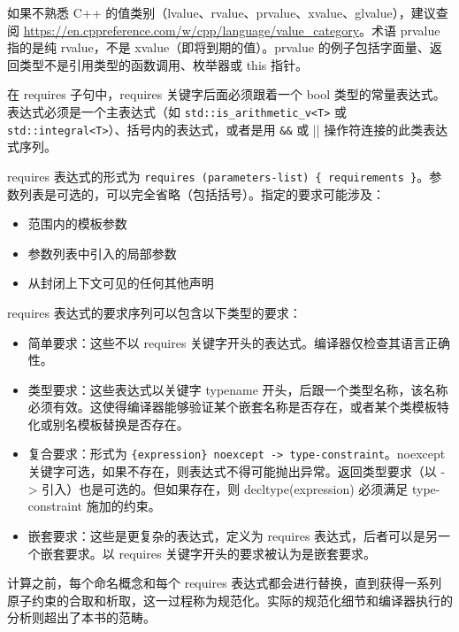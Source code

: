 \begin{myNotic}
如果不熟悉 C++ 的值类别（lvalue、rvalue、prvalue、xvalue、glvalue），建议查阅 \url{https://en.cppreference.com/w/cpp/language/value_category}。术语 prvalue 指的是纯 rvalue，不是 xvalue（即将到期的值）。prvalue 的例子包括字面量、返回类型不是引用类型的函数调用、枚举器或 this 指针。
\end{myNotic}

在 requires 子句中，requires 关键字后面必须跟着一个 bool 类型的常量表达式。表达式必须是一个主表达式（如 \verb|std::is_arithmetic_v<T>| 或 \verb|std::integral<T>|）、括号内的表达式，或者是用 \verb|&&| 或 || 操作符连接的此类表达式序列。

requires 表达式的形式为 \verb|requires (parameters-list) { requirements }|。参数列表是可选的，可以完全省略（包括括号）。指定的要求可能涉及：

\begin{itemize}
\item
范围内的模板参数

\item
参数列表中引入的局部参数

\item
从封闭上下文可见的任何其他声明
\end{itemize}

requires 表达式的要求序列可以包含以下类型的要求：

\begin{itemize}
\item
简单要求：这些不以 requires 关键字开头的表达式。编译器仅检查其语言正确性。

\item
类型要求：这些表达式以关键字 typename 开头，后跟一个类型名称，该名称必须有效。这使得编译器能够验证某个嵌套名称是否存在，或者某个类模板特化或别名模板替换是否存在。

\item
复合要求：形式为 \verb|{expression} noexcept -> type-constraint|。noexcept 关键字可选，如果不存在，则表达式不得可能抛出异常。返回类型要求（以 -> 引入）也是可选的。但如果存在，则 decltype(expression) 必须满足 type-constraint 施加的约束。

\item
嵌套要求：这些是更复杂的表达式，定义为 requires 表达式，后者可以是另一个嵌套要求。以 requires 关键字开头的要求被认为是嵌套要求。
\end{itemize}

计算之前，每个命名概念和每个 requires 表达式都会进行替换，直到获得一系列原子约束的合取和析取，这一过程称为规范化。实际的规范化细节和编译器执行的分析则超出了本书的范畴。

